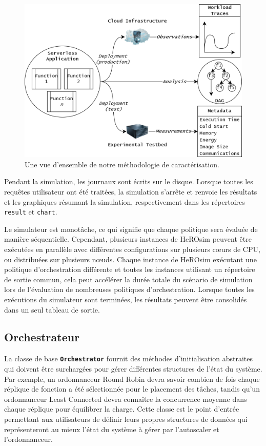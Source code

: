 \begin{figure}[t]
    \centering
    \includegraphics[width=\columnwidth]{7_Chapitre5/figures/characterization.png}
    \caption{Une vue d'ensemble de notre méthodologie de caractérisation.}
\label{figure:herosim-characterization}
\end{figure}

Pendant la simulation, les journaux sont écrits sur le disque. Lorsque toutes les requêtes utilisateur ont été traitées, la simulation s'arrête et renvoie les résultats et les graphiques résumant la simulation, respectivement dans les répertoires \texttt{result} et \texttt{chart}.

Le simulateur est monotâche, ce qui signifie que chaque politique sera évaluée de manière séquentielle. Cependant, plusieurs instances de HeROsim peuvent être exécutées en parallèle avec différentes configurations sur plusieurs cœurs de CPU, ou distribuées sur plusieurs nœuds. Chaque instance de HeROsim exécutant une politique d'orchestration différente et toutes les instances utilisant un répertoire de sortie commun, cela peut accélérer la durée totale du scénario de simulation lors de l'évaluation de nombreuses politiques d'orchestration. Lorsque toutes les exécutions du simulateur sont terminées, les résultats peuvent être consolidés dans un seul tableau de sortie.

\subsection{Orchestrateur}

La classe de base \textbf{\texttt{Orchestrator}} fournit des méthodes d'initialisation abstraites qui doivent être surchargées pour gérer différentes structures de l'état du système. Par exemple, un ordonnanceur Round Robin devra savoir combien de fois chaque réplique de fonction a été sélectionnée pour le placement des tâches, tandis qu'un ordonnanceur Least Connected devra connaître la concurrence moyenne dans chaque réplique pour équilibrer la charge. Cette classe est le point d'entrée permettant aux utilisateurs de définir leurs propres structures de données qui représenteront au mieux l'état du système à gérer par l'autoscaler et l'ordonnanceur.

